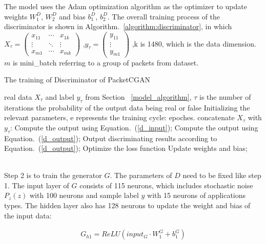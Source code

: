 \documentclass[conference]{IEEEtran}
\begin{document}
The model uses the Adam optimization algorithm as the optimizer to update weights $W^D_1$, $W^D_2$ and bias $b^D_1$,  $b^D_2$. The overall training process of the discriminator is shown in Algorithm.~\ref{algorithm:discriminator}, in which $X_{\tau}=\begin{pmatrix}
x_{11}&\cdots&x_{1k}\\
\vdots&\ddots&\vdots\\
x_{m1}&\cdots&x_{mk}
\end{pmatrix}$
,$y_{\tau}=\begin{pmatrix}
y_{11}\\
\vdots\\
y_{m1}
\end{pmatrix}$
,k is 1480, which is the data dimension. $m$ is mini\_batch referring to a group of packets from dataset.

\begin{algorithm}[htbp]
	\caption{The training of Discriminator of PacketCGAN}  \label{algorithm:discriminator}
	\begin{algorithmic}[1]  
		\REQUIRE real data $X_{\tau}$ and label $y_{\tau}$ from Section ~\ref{model_algorithm}, $\tau$ is the number of iterations
		\ENSURE the probability of the output data being real or false 
		\STATE Initializing the relevant parameters, e represents the training cycle: epoches.
		\STATE concatenate {\tiny } $X_\tau$ with $y_\tau$: 
		\STATE Compute the output using Equation.~(\ref{d_input});
		\STATE Compute the output using Equation.~(\ref{d_output});
		\STATE Output discriminating results according to Equation.~(\ref{d_output});
		\STATE Optimize the loss function
		\STATE Update weights and bias;
		\ENDFOR \\ %
		\ENDFOR \\ %
	\end{algorithmic}  
\end{algorithm}  

Step 2 is to train the generator $G$. The parameters of $D$ need to be fixed like step 1. The input layer of $G$ consists of 115 neurons, which includes stochastic noise $P_z(z)$ with 100 neurons and sample label $y$ with 15 neurons of applications types. The hidden layer also has 128 neurons to update the weight and bias of the input data:

\begin{equation}
\begin{split}
\label{g_input}
G_{h1}=ReLU(input_G\cdot W^G_1+b^G_1)
\end{split}
\end{equation}
\end{document}
